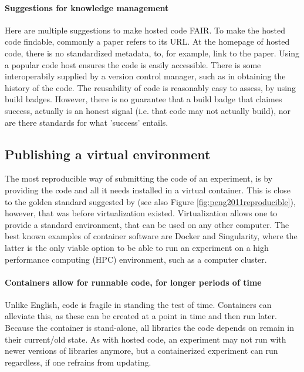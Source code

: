 \paragraph{Suggestions for knowledge management}

Here are multiple suggestions to make hosted code FAIR.
To make the hosted code findable, commonly a paper refers to its URL.
At the homepage of hosted code, there is no standardized metadata, to,
for example, link to the paper.
Using a popular code host ensures the code is easily accessible.
There is some interoperabily supplied by a version control manager,
such as in obtaining the history of the code.
The reusability of code is reasonably easy to assess, by using build badges.
However, there is no guarantee that a build badge that claimes success,
actually is an honest signal (i.e. that code may not actually build),
nor are there standards for what 'success' entails.

\subsection{Publishing a virtual environment}

The most reproducible way of submitting the code of an experiment,
is by providing the code and all it needs 
installed in a virtual container.
This is close to the golden standard suggested by 
\cite{peng2011reproducible} (see also Figure \ref{fig:peng2011reproducible}),
however, that was before virtualization existed.
Virtualization allows one to provide a standard environment,
that can be used on any other computer.
The best known examples of container software are Docker and Singularity,
where the latter is the only viable option to be able to run
an experiment on a high performance computing (HPC) environment,
such as a computer cluster.

\paragraph{Containers allow for runnable code, for longer periods of time}

Unlike English, code is fragile in standing the test of time.
Containers can alleviate this, as these can be created at a point
in time and then run later. Because the container is stand-alone,
all libraries the code depends on remain in their current/old state.
As with hosted code, an experiment may not run with newer versions
of libraries anymore, but a containerized experiment can run regardless, if
one refrains from updating.

